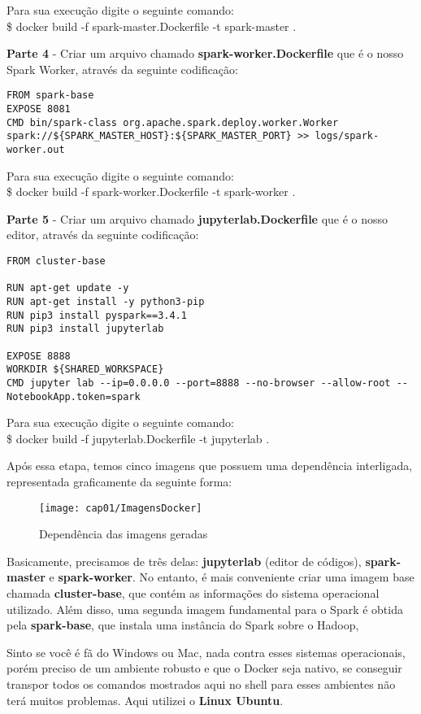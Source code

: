 Para sua execução digite o seguinte comando: \\
{\ttfamily\$ docker build -f spark-master.Dockerfile -t spark-master .} 
 
\textbf{Parte 4} - Criar um arquivo chamado \textbf{spark-worker.Dockerfile} que é o nosso Spark Worker, através da seguinte codificação:
\begin{lstlisting}[]
FROM spark-base
EXPOSE 8081
CMD bin/spark-class org.apache.spark.deploy.worker.Worker spark://${SPARK_MASTER_HOST}:${SPARK_MASTER_PORT} >> logs/spark-worker.out
\end{lstlisting}

Para sua execução digite o seguinte comando: \\
{\ttfamily\$ docker build -f spark-worker.Dockerfile -t spark-worker .} 
 
\textbf{Parte 5} - Criar um arquivo chamado \textbf{jupyterlab.Dockerfile} que é o nosso editor, através da seguinte codificação:
\begin{lstlisting}[]
FROM cluster-base

RUN apt-get update -y
RUN apt-get install -y python3-pip
RUN pip3 install pyspark==3.4.1
RUN pip3 install jupyterlab

EXPOSE 8888
WORKDIR ${SHARED_WORKSPACE}
CMD jupyter lab --ip=0.0.0.0 --port=8888 --no-browser --allow-root --NotebookApp.token=spark
\end{lstlisting}

Para sua execução digite o seguinte comando: \\
{\ttfamily\$ docker build -f jupyterlab.Dockerfile -t jupyterlab .} 

Após essa etapa, temos cinco imagens que possuem uma dependência interligada, representada graficamente da seguinte forma:
\begin{figure}[H]
	\centering\texttt{[image: cap01/ImagensDocker]}
	\caption{Dependência das imagens geradas}
\end{figure}

Basicamente, precisamos de três delas: \textbf{jupyterlab} (editor de códigos), \textbf{spark-master} e \textbf{spark-worker}. No entanto, é mais conveniente criar uma imagem base chamada \textbf{cluster-base}, que contém as informações do sistema operacional utilizado. Além disso, uma segunda imagem fundamental para o Spark é obtida pela \textbf{spark-base}, que instala uma instância do Spark sobre o Hadoop,

\begin{note} 
	Sinto se você é fã do Windows ou Mac, nada contra esses sistemas operacionais, porém preciso de um ambiente robusto e que o Docker seja nativo, se conseguir transpor todos os comandos mostrados aqui no shell para esses ambientes não terá muitos problemas. Aqui utilizei o \textbf{Linux Ubuntu}.
\end{note}

